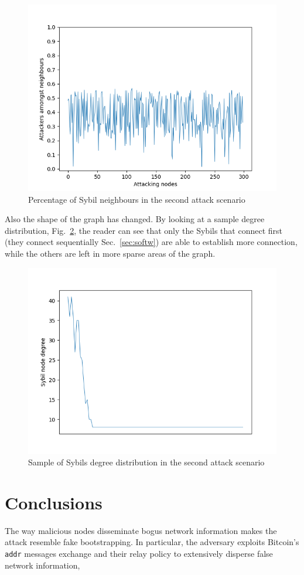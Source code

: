 \documentclass[12pt, letterpaper, twoside]{article}
\begin{document}
\begin{figure}[h!]
	\includegraphics[width=.7\textwidth]{pict/results/ext-hon-atk-neigh.png}
	\centering
	\caption{Percentage of Sybil neighbours in the second attack scenario}
	\label{fig:ex-atk-neigh}
\end{figure}

Also the shape of the graph has changed. By looking at a sample degree distribution, Fig.~\ref{fig:dd}, the reader can see that only the Sybils that connect first (they connect sequentially Sec.~\ref{sec:softw}) are able to establish more connection, while the others are left in more sparse areas of the graph.

\begin{figure}[h!]
	\includegraphics[width=.7\textwidth]{pict/results/ex-atk-dd.png}
	\centering
	\caption{Sample of Sybils degree distribution in the second attack scenario}
	\label{fig:dd}
\end{figure}



\section{Conclusions}\label{sec:concl}
The way malicious nodes disseminate bogus network information makes the attack resemble fake bootstrapping. In particular, the adversary exploits Bitcoin's \texttt{addr} messages exchange and their relay policy to extensively disperse false network information, 
\end{document}
